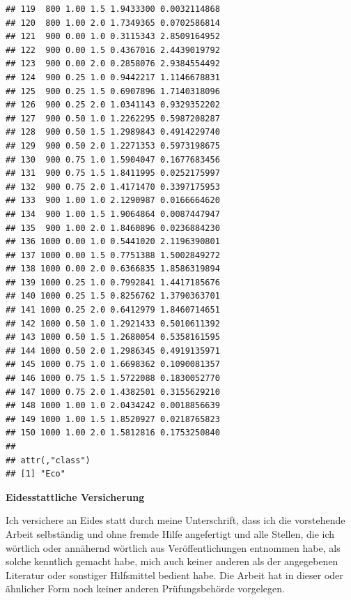 \documentclass[11pt,a4paper]{article}
\begin{document}
\begin{verbatim}
## 119  800 1.00 1.5 1.9433300 0.0032114868
## 120  800 1.00 2.0 1.7349365 0.0702586814
## 121  900 0.00 1.0 0.3115343 2.8509164952
## 122  900 0.00 1.5 0.4367016 2.4439019792
## 123  900 0.00 2.0 0.2858076 2.9384554492
## 124  900 0.25 1.0 0.9442217 1.1146678831
## 125  900 0.25 1.5 0.6907896 1.7140318096
## 126  900 0.25 2.0 1.0341143 0.9329352202
## 127  900 0.50 1.0 1.2262295 0.5987208287
## 128  900 0.50 1.5 1.2989843 0.4914229740
## 129  900 0.50 2.0 1.2271353 0.5973198675
## 130  900 0.75 1.0 1.5904047 0.1677683456
## 131  900 0.75 1.5 1.8411995 0.0252175997
## 132  900 0.75 2.0 1.4171470 0.3397175953
## 133  900 1.00 1.0 2.1290987 0.0166664620
## 134  900 1.00 1.5 1.9064864 0.0087447947
## 135  900 1.00 2.0 1.8460896 0.0236884230
## 136 1000 0.00 1.0 0.5441020 2.1196390801
## 137 1000 0.00 1.5 0.7751388 1.5002849272
## 138 1000 0.00 2.0 0.6366835 1.8586319894
## 139 1000 0.25 1.0 0.7992841 1.4417185676
## 140 1000 0.25 1.5 0.8256762 1.3790363701
## 141 1000 0.25 2.0 0.6412979 1.8460714651
## 142 1000 0.50 1.0 1.2921433 0.5010611392
## 143 1000 0.50 1.5 1.2680054 0.5358161595
## 144 1000 0.50 2.0 1.2986345 0.4919135971
## 145 1000 0.75 1.0 1.6698362 0.1090081357
## 146 1000 0.75 1.5 1.5722088 0.1830052770
## 147 1000 0.75 2.0 1.4382501 0.3155629210
## 148 1000 1.00 1.0 2.0434242 0.0018856639
## 149 1000 1.00 1.5 1.8520927 0.0218765823
## 150 1000 1.00 2.0 1.5812816 0.1753250840
## 
## attr(,"class")
## [1] "Eco"
\end{verbatim}
\renewcommand*{\mkbibnamefamily}[1]{\textbf{#1}}
\renewcommand*{\mkbibnamegiven}[1]{\textbf{#1}}
\renewcommand*{\mkbibnameprefix}[1]{\textbf{#1}}
\renewcommand*{\mkbibnamesuffix}[1]{\textbf{#1}}
\printbibliography[title=References]

\newpage
\textbf{Eidesstattliche Versicherung}

\bigskip

Ich versichere an Eides statt durch meine Unterschrift, dass ich die vorstehende Arbeit selbständig und ohne fremde Hilfe angefertigt und alle Stellen, die ich wörtlich oder annähernd wörtlich aus Veröffentlichungen entnommen habe, als solche kenntlich gemacht habe, mich auch keiner anderen als der angegebenen Literatur oder sonstiger Hilfsmittel bedient habe. Die Arbeit hat in dieser oder ähnlicher Form noch keiner anderen Prüfungsbehörde vorgelegen.

\vspace{1cm}
\rule{0pt}{2\baselineskip} %
\par\noindent{} \hfill\makebox[2.25in]{\hrulefill}%
\par\noindent\makebox[2.25in][l]{} \hfill{}%
\end{document}
